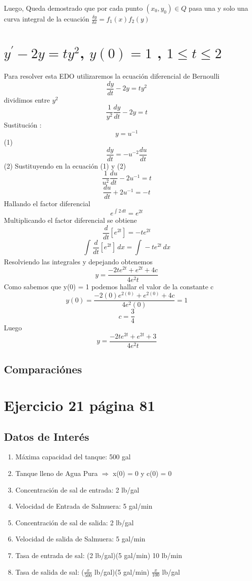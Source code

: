 \documentclass{article}
\begin{document}
        Luego, Queda demostrado que por cada punto $ (x_0, y_0) \in Q $ pasa una y solo una curva 
        integral de la ecuación $\frac{\delta y}{\delta x} = f_{1}(x)f_{2}(y)$

    \section{$ y^{'} - 2y = ty^{2} $, $ y(0) = 1 $ , $ 1 \leq t\leq 2 $ }

    Para resolver esta EDO utilizaremos la ecuación diferencial de Bernoulli 
    \[ \frac{dy}{dt} - 2y = ty^{2} \]dividimos entre $ y^{2} $ 
    \[ \frac{1}{y^{2}}\frac{dy}{dt} - 2y = t \]
    Sustitución :
    \[ y = u^{-1} \] (1)
    \[ \frac{dy}{dt} = -u^{-2}\frac{du}{dt} \] (2)
    Sustituyendo en la ecuación (1) y (2)
    \[ \frac{1}{u^{2}}\frac{du}{dt} - 2u^{-1} = t \]
    \[ \frac{du}{dt} + 2u^{-1} = -t \]
    Hallando el factor diferencial 
    \[ e^{\int_{}^{} 2 \,dt } = e^{2t} \]
    Multiplicando el factor diferencial se obtiene
    \[ \frac{d}{dt}[e^{2t}] = -te^{2t} \]
    \[ \int_{}^{} \frac{d}{dt}[e^{2t}] \,dx = \int_{}^{} -te^{2t} \,dx \]
    Resolviendo las integrales y depejando obtenemos 
    \[ y = \frac{-2te^{2t} + e^{2t} + 4c}{4e^2t} \]
    Como sabemos que y(0) = 1 podemos hallar el valor de la constante c 
    \[ y(0) = \frac{-2(0)e^{2(0)} + e^{2(0)} + 4c}{4e^2(0)}  = 1 \]
    \[ c = \frac{3}{4} \]
    Luego  \[ y =  \frac{-2te^{2t} + e^{2t} + 3}{4e^2t} \] 
    \subsection{Comparaciónes}

    \section{Ejercicio 21 página 81}

        \subsection{Datos de Interés}
        \begin{enumerate}
            \item Máxima capacidad del tanque: 500 gal
            \item Tanque lleno de Agua Pura $\Rightarrow$ x(0) = 0 y c(0) = 0
            \item Concentración de sal de entrada: 2 lb/gal
            \item Velocidad de Entrada de Salmuera: 5 gal/min
            \item Concentración de sal de salida: 2 lb/gal
            \item Velocidad de salida de Salmuera: 5 gal/min
            \item Tasa de entrada de sal: (2 lb/gal)(5 gal/min) 10 lb/min
            \item Tasa de salida de sal: ($\frac{x}{500}$ lb/gal)(5 gal/min) $\frac{x}{100}$ lb/gal  
        \end{enumerate}
\end{document}
